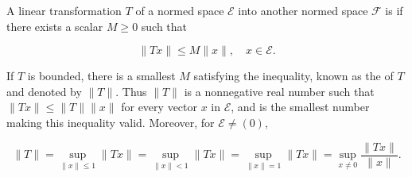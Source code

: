 A linear transformation $T$ of a normed space $\mathcal{E}$ into another normed space $\mathcal{F}$ is  if there exists a scalar $M \geq 0$ such that

$$\| Tx \| \leq M \| x \|, \quad x \in \mathcal{E}.$$

If $T$ is bounded, there is a smallest $M$ satisfying the inequality, known as the  of $T$ and denoted by $\| T \|$. Thus $\| T \|$ is a nonnegative real number such that $\| Tx \| \leq \| T \| \| x \|$ for every vector $x$ in $\mathcal{E}$, and is the smallest number making this inequality valid. Moreover, for $\mathcal{E} \neq (0)$,

$$\| T \| = \sup_{\| x \| \leq 1} \| Tx \| = \sup_{\| x \| < 1} \| Tx \| = \sup_{\| x \| = 1} \| Tx \| = \sup_{x \neq 0} \frac{\| Tx \|}{\| x \|}.$$
